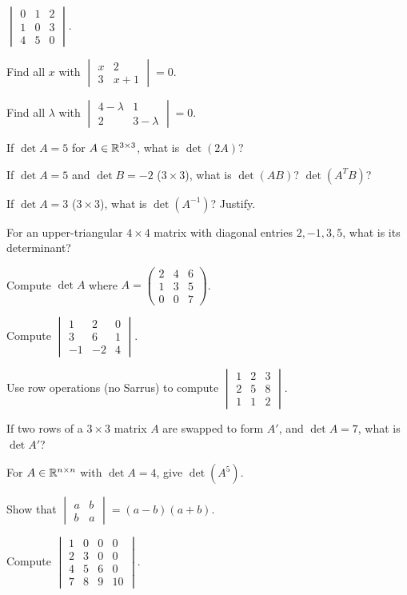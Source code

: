 \begin{problems}
  \item $\begin{vmatrix} 0 & 1 & 2 \\ 1 & 0 & 3 \\ 4 & 5 & 0 \end{vmatrix}$.
  \item Find all $x$ with $\begin{vmatrix} x & 2 \\ 3 & x + 1 \end{vmatrix} = 0$.
  \item Find all $\lambda$ with $\begin{vmatrix} 4 - \lambda & 1 \\ 2 & 3 - \lambda \end{vmatrix} = 0$.
  \item If $\det A = 5$ for $A \in \mathbb{R}^{3 \times 3}$, what is $\det(2 A)$?
  \item If $\det A = 5$ and $\det B = -2$ ($3 \times 3$), what is
        $\det(A B)$? $\det(A^{T} B)$?
  \item If $\det A = 3$ ($3 \times 3$), what is $\det(A^{-1})$? Justify.
  \item For an upper-triangular $4 \times 4$ matrix with diagonal entries
        $2, -1, 3, 5$, what is its determinant?
  \item Compute $\det A$ where
        $A = \begin{pmatrix} 2 & 4 & 6 \\ 1 & 3 & 5 \\ 0 & 0 & 7 \end{pmatrix}$.
  \item Compute $\begin{vmatrix} 1 & 2 & 0 \\ 3 & 6 & 1 \\ -1 & -2 & 4 \end{vmatrix}$.
  \item Use row operations (no Sarrus) to compute
        $\begin{vmatrix} 1 & 2 & 3 \\ 2 & 5 & 8 \\ 1 & 1 & 2 \end{vmatrix}$.
  \item If two rows of a $3 \times 3$ matrix $A$ are swapped to form $A'$,
        and $\det A = 7$, what is $\det A'$?
  \item For $A \in \mathbb{R}^{n \times n}$ with $\det A = 4$, give $\det(A^{5})$.
  \item Show that $\begin{vmatrix} a & b \\ b & a \end{vmatrix} = (a - b)(a + b)$.
  \item Compute $\begin{vmatrix} 1 & 0 & 0 & 0 \\ 2 & 3 & 0 & 0 \\ 4 & 5 & 6 & 0 \\ 7 & 8 & 9 & 10 \end{vmatrix}$.
\end{problems}

